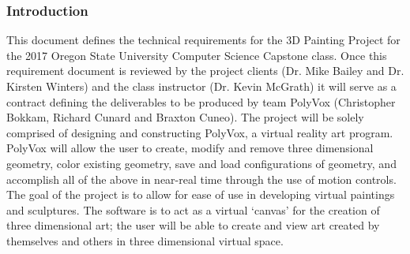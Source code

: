 \documentclass[onecolumn, draftclsnofoot,10pt, compsoc]{IEEEtran}
\newcounter{threesection}[subsubsection]
\begin{document}
\subsubsection{Introduction}
This document defines the technical requirements for the 3D Painting Project for the 2017 Oregon State University Computer Science Capstone class.
Once this requirement document is reviewed by the project clients (Dr. Mike Bailey and Dr. Kirsten Winters) and the class instructor (Dr. Kevin McGrath) it will serve as a contract defining the deliverables to be produced by team PolyVox (Christopher Bokkam, Richard Cunard and Braxton Cuneo).
The project will be solely comprised of designing and constructing PolyVox, a virtual reality art program.
PolyVox will allow the user to create, modify and remove three dimensional geometry, color existing geometry, save and load configurations of geometry, and accomplish all of the above in near-real time through the use of motion controls.
The goal of the project is to allow for ease of use in developing virtual paintings and sculptures. The software is to act as a virtual ‘canvas’ for the creation of three dimensional art; the user will be able to create and view art created by themselves and others in three dimensional virtual space. 
\end{document}

